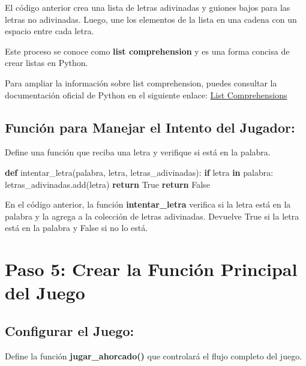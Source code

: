\documentclass[
  a4paper,
  DIV=11,
  numbers=noendperiod,
  onepage,
  openany]{scrreprt}
\newenvironment{Shaded}{\begin{snugshade}}{\end{snugshade}}
\newcommand{\ControlFlowTok}[1]{\textcolor[rgb]{0.00,0.23,0.31}{\textbf{#1}}}
\newcommand{\KeywordTok}[1]{\textcolor[rgb]{0.00,0.23,0.31}{\textbf{#1}}}
\newcommand{\NormalTok}[1]{\textcolor[rgb]{0.00,0.23,0.31}{#1}}
\newcommand{\VariableTok}[1]{\textcolor[rgb]{0.07,0.07,0.07}{#1}}
\begin{document}
El código anterior crea una lista de letras adivinadas y guiones bajos
para las letras no adivinadas. Luego, une los elementos de la lista en
una cadena con un espacio entre cada letra.

Este proceso se conoce como \textbf{list comprehension} y es una forma
concisa de crear listas en Python.

Para ampliar la información sobre list comprehension, puedes consultar
la documentación oficial de Python en el siguiente enlace:
\href{https://docs.python.org/3/tutorial/datastructures.html\#list-comprehensions}{List
Comprehensions}

\subsection{Función para Manejar el Intento del
Jugador:}\label{funciuxf3n-para-manejar-el-intento-del-jugador}

Define una función que reciba una letra y verifique si está en la
palabra.

\begin{Shaded}
\begin{Highlighting}[]
\KeywordTok{def}\NormalTok{ intentar\_letra(palabra, letra, letras\_adivinadas):}
    \ControlFlowTok{if}\NormalTok{ letra }\KeywordTok{in}\NormalTok{ palabra:}
\NormalTok{        letras\_adivinadas.add(letra)}
        \ControlFlowTok{return} \VariableTok{True}
    \ControlFlowTok{return} \VariableTok{False}
\end{Highlighting}
\end{Shaded}

En el código anterior, la función \textbf{intentar\_letra} verifica si
la letra está en la palabra y la agrega a la colección de letras
adivinadas. Devuelve True si la letra está en la palabra y False si no
lo está.

\section{Paso 5: Crear la Función Principal del
Juego}\label{paso-5-crear-la-funciuxf3n-principal-del-juego}

\subsection{Configurar el Juego:}\label{configurar-el-juego}

Define la función \textbf{jugar\_ahorcado()} que controlará el flujo
completo del juego.
\end{document}
